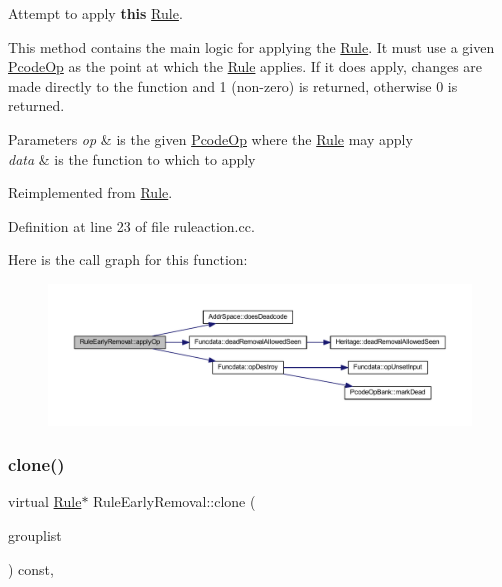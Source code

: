 Attempt to apply {\bfseries{this}} \mbox{\hyperlink{class_rule}{Rule}}. 

This method contains the main logic for applying the \mbox{\hyperlink{class_rule}{Rule}}. It must use a given \mbox{\hyperlink{class_pcode_op}{Pcode\+Op}} as the point at which the \mbox{\hyperlink{class_rule}{Rule}} applies. If it does apply, changes are made directly to the function and 1 (non-\/zero) is returned, otherwise 0 is returned. 
\begin{DoxyParams}{Parameters}
{\em op} & is the given \mbox{\hyperlink{class_pcode_op}{Pcode\+Op}} where the \mbox{\hyperlink{class_rule}{Rule}} may apply \\
\hline
{\em data} & is the function to which to apply \\
\hline
\end{DoxyParams}


Reimplemented from \mbox{\hyperlink{class_rule_a4e3e61f066670175009f60fb9dc60848}{Rule}}.



Definition at line 23 of file ruleaction.\+cc.

Here is the call graph for this function\+:
\nopagebreak
\begin{figure}[H]
\begin{center}
\leavevmode
\includegraphics[width=350pt]{class_rule_early_removal_a8409f6b8ffe4ba8b6f59140b6da58d12_cgraph}
\end{center}
\end{figure}
\mbox{\label{class_rule_early_removal_a51a80e5b1a90383f7ab38dd5da1b19c0}} 
\subsubsection{\texorpdfstring{clone()}{clone()}}
{\footnotesize\ttfamily virtual \mbox{\hyperlink{class_rule}{Rule}}$\ast$ Rule\+Early\+Removal\+::clone (\begin{DoxyParamCaption}\item[{const \mbox{\hyperlink{class_action_group_list}{Action\+Group\+List}} \&}]{grouplist }\end{DoxyParamCaption}) const\hspace{0.3cm}{\ttfamily [inline]}, {\ttfamily [virtual]}}



